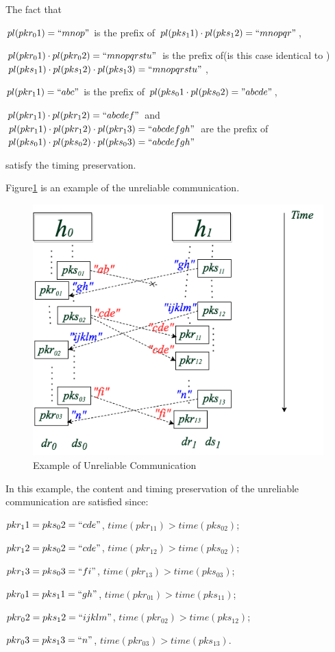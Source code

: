 The fact that
 
$pl(pkr_01) = ``mnop"$ is the prefix of $pl(pks_11) \cdot  pl(pks_12) = ``mnopqr"$,

$pl(pkr_01) \cdot pl(pkr_02)=``mnopqrstu"$ is the prefix of(is this case identical to ) $pl(pks_11) \cdot pl(pks_12) \cdot pl(pks_13) = ``mnopqrstu" $,  

$pl(pkr_11)=``abc"$ is the prefix of $pl(pks_01 \cdot pl(pks_02) = "abcde"$,  

$pl(pkr_11) \cdot pl(pkr_12)= ``abcdef"$ and  $pl(pkr_11) \cdot pl(pkr_12) \cdot pl(pkr_13) = ``abcdefgh"$ are  the prefix of  $pl(pks_01) \cdot pl(pks_02) \cdot pl(pks_03)= ``abcdefgh"$

satisfy the timing preservation. 


Figure\ref{unreliableexample} is an example of the unreliable communication. 

\begin{figure}[H]
\centerline{\includegraphics[scale=0.55]{Figures/unreliableexample}}
\caption{Example of Unreliable Communication}
\label{unreliableexample}
\end{figure}

In this example, the content and timing preservation of the unreliable communication are satisfied since: 

$pkr_11 = pks_02=``cde"$, $time(pkr_11) > time(pks_02)$; 

$pkr_12 = pks_02=``cde"$, $time(pkr_12) > time(pks_02)$; 

$pkr_13 = pks_03=``fi"$, $time(pkr_13) > time(pks_03)$;

$pkr_01 = pks_11=``gh"$, $time(pkr_01) > time(pks_11)$;

$pkr_02 = pks_12=``ijklm"$, $time(pkr_02) > time(pks_12)$;

$pkr_03 = pks_13=``n"$, $time(pkr_03) > time(pks_13)$.


